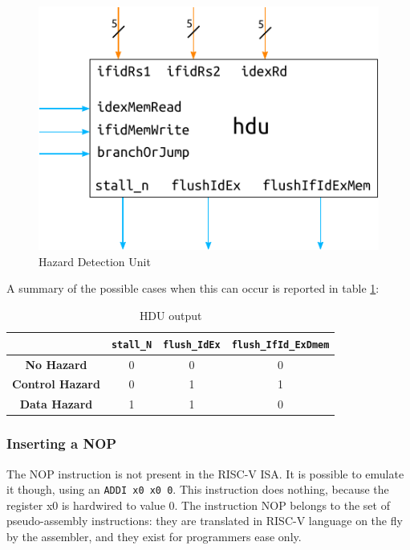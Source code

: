 \documentclass[a4paper]{article}
\begin{document}
\begin{figure}[hbtp]
    \centering
    \includegraphics[]{../hdu/ref/schematic/hdu.pdf}
    \caption{Hazard Detection Unit}
    \label{fig:hdu}
\end{figure}
A summary of the possible cases when this can occur is reported in table \ref{tab:hdu_output}:

\begin{table}[hbtp]
\centering
\begin{tabular}{|c|c|c|c|}
\hline
                        & \texttt{stall\_N} & \texttt{flush\_IdEx} & \texttt{flush\_IfId\_ExDmem} \\ \hline
\textbf{No Hazard}      & 0                          & 0                             & 0                                     \\ \hline
\textbf{Control Hazard} & 0                          & 1                             & 1                                     \\ \hline
\textbf{Data Hazard}    & 1                          & 1                             & 0                                     \\ \hline
\end{tabular}
\caption{HDU output}
\label{tab:hdu_output}
\end{table}

\subsubsection{Inserting a NOP}
The NOP instruction is not present in the RISC-V ISA. It is possible to emulate it though, using an \texttt{ADDI x0 x0 0}. This instruction does nothing, because the register x0 is hardwired to value 0. The instruction NOP belongs to the set of pseudo-assembly instructions: they are translated in RISC-V language on the fly by the assembler, and they exist for programmers ease only.
\end{document}
